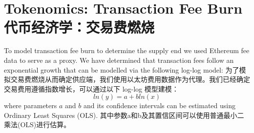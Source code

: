 \documentclass{ctexart}
\begin{document}
\section{Tokenomics: Transaction Fee Burn 代币经济学：交易费燃烧}
\label{appendix:tx_fee_burn}

To model transaction fee burn to determine the supply end we used Ethereum fee data to serve as a proxy. We have determined that transaction fees follow an exponential growth that can be modelled via the following log-log model:
为了模拟交易费燃烧从而确定供应端，我们使用以太坊费用数据作为代理。我们已经确定交易费用遵循指数增长，可以通过以下 log-log 模型建模：
\begin{equation}
ln(y) = a + bln(x)
\end{equation}
where parameters $a$ and $b$ and its confidence intervals can be estimated using Ordinary Least Squares (OLS). 其中参数a和b及其置信区间可以使用普通最小二乘法(OLS)进行估算。
\end{document}
